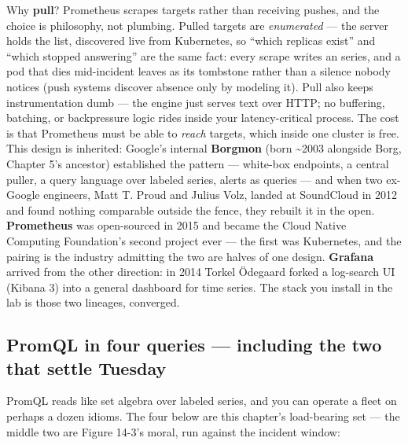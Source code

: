 Why \textbf{pull}? Prometheus scrapes targets rather than receiving pushes, and the choice is philosophy, not plumbing. Pulled targets are \textit{enumerated} — the server holds the list, discovered live from Kubernetes, so “which replicas exist” and “which stopped answering” are the same fact: every scrape writes an  series, and a pod that dies mid-incident leaves  as its tombstone rather than a silence nobody notices (push systems discover absence only by modeling it). Pull also keeps instrumentation dumb — the engine just serves text over HTTP; no buffering, batching, or backpressure logic rides inside your latency-critical process. The cost is that Prometheus must be able to \textit{reach} targets, which inside one cluster is free. This design is inherited: Google’s internal \textbf{Borgmon} (born \textasciitilde{}2003 alongside Borg, Chapter 5’s ancestor) established the pattern — white-box  endpoints, a central puller, a query language over labeled series, alerts as queries — and when two ex-Google engineers, Matt T. Proud and Julius Volz, landed at SoundCloud in 2012 and found nothing comparable outside the fence, they rebuilt it in the open. \textbf{Prometheus} was open-sourced in 2015 and became the Cloud Native Computing Foundation’s second project ever — the first was Kubernetes, and the pairing is the industry admitting the two are halves of one design. \textbf{Grafana} arrived from the other direction: in 2014 Torkel Ödegaard forked a log-search UI (Kibana 3) into a general dashboard for time series. The stack you install in the lab is those two lineages, converged.

\subsection*{PromQL in four queries — including the two that settle Tuesday}

PromQL reads like set algebra over labeled series, and you can operate a fleet on perhaps a dozen idioms. The four below are this chapter’s load-bearing set — the middle two are Figure 14-3’s moral, run against the incident window:

